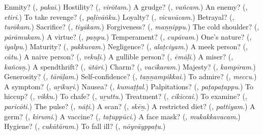 \begin{tcolorbox}[breakable,colback=teal!4,colframe=teal!35!black,title={Before you move on}]
Enmity? (\textbf{}, \emph{pakai}.) Hostility? (\textbf{}, \emph{virōtam}.) A grudge? (\textbf{}, \emph{vañcam}.) An enemy? (\textbf{}, \emph{etiri}.) To take revenge? (\textbf{}, \emph{paḻivāṅku}.) Loyalty? (\textbf{}, \emph{vicuvācam}.) Betrayal? (\textbf{}, \emph{turōkam}.) Sacrifice? (\textbf{}, \emph{tiyākam}.) Forgiveness? (\textbf{}, \emph{maṉṉippu}.) The cold shoulder? (\textbf{}, \emph{pārāmukam}.) A virtue? (\textbf{}, \emph{paṇpu}.) Temperament? (\textbf{}, \emph{cupāvam}.) One’s nature? (\textbf{}, \emph{iyalpu}.) Maturity? (\textbf{}, \emph{pakkuvam}.) Negligence? (\textbf{}, \emph{alaṭciyam}.) A meek person? (\textbf{}, \emph{cātu}.) A naive person? (\textbf{}, \emph{vekuḷi}.) A gullible person? (\textbf{}, \emph{ēmāḷi}.) A miser? (\textbf{}, \emph{kañcaṉ}.) A spendthrift? (\textbf{}, \emph{ūtāri}.) Charm? (\textbf{}, \emph{vacīkaram}.) Majesty? (\textbf{}, \emph{kampīram}.) Generosity? (\textbf{}, \emph{tārāḷam}.) Self-confidence? (\textbf{}, \emph{taṉṉampikkai}.) To admire? (\textbf{}, \emph{meccu}.) A symptom? (\textbf{}, \emph{aṟikuṟi}.) Nausea? (\textbf{}, \emph{kumaṭṭal}.) Palpitations? (\textbf{}, \emph{paṭapaṭappu}.) To hiccup? (\textbf{}, \emph{vikku}.) To chafe? (\textbf{}, \emph{uṟuttu}.) Treatment? (\textbf{}, \emph{cikiccai}.) To examine? (\textbf{}, \emph{paricōti}.) The pulse? (\textbf{}, \emph{nāṭi}.) A scan? (\textbf{}, \emph{skēṉ}.) A restricted diet? (\textbf{}, \emph{pattiyam}.) A germ? (\textbf{}, \emph{kirumi}.) A vaccine? (\textbf{}, \emph{taṭuppūci}.) A face mask? (\textbf{}, \emph{mukakkavacam}.) Hygiene? (\textbf{}, \emph{cukātāram}.) To fall ill? (\textbf{}, \emph{nōyvāyppaṭu}.)
\end{tcolorbox}

